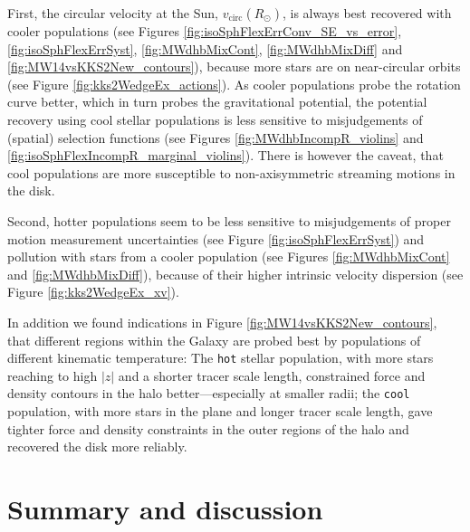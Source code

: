 \documentclass[iop,revtex4,numberedappendix,appendixfloats]{emulateapj}
\begin{document}
First, the circular velocity at the Sun, $v_\text{circ}(R_\odot)$, is always best recovered with cooler populations (see Figures \ref{fig:isoSphFlexErrConv_SE_vs_error}, \ref{fig:isoSphFlexErrSyst}, \ref{fig:MWdhbMixCont}, \ref{fig:MWdhbMixDiff} and \ref{fig:MW14vsKKS2New_contours}), because more stars are on near-circular orbits (see Figure \ref{fig:kks2WedgeEx_actions}). As cooler populations probe the rotation curve better, which in turn probes the gravitational potential, the potential recovery using cool stellar populations is less sensitive to misjudgements of (spatial) selection functions (see Figures \ref{fig:MWdhbIncompR_violins} and \ref{fig:isoSphFlexIncompR_marginal_violins}). There is however the caveat, that cool populations are more susceptible to non-axisymmetric streaming motions in the disk.

Second, hotter populations seem to be less sensitive to misjudgements of proper motion measurement uncertainties (see Figure \ref{fig:isoSphFlexErrSyst}) and pollution with stars from a cooler population (see Figures \ref{fig:MWdhbMixCont} and \ref{fig:MWdhbMixDiff}), because of their higher intrinsic velocity dispersion (see Figure \ref{fig:kks2WedgeEx_xv}).

In addition we found indications in Figure \ref{fig:MW14vsKKS2New_contours}, that different regions within the Galaxy are probed best by populations of different kinematic temperature: The \texttt{hot} stellar population, with more stars reaching to high $|z|$ and a shorter tracer scale length, constrained force and density contours in the halo better---especially at smaller radii; the \texttt{cool} population, with more stars in the plane and longer tracer scale length, gave tighter force and density constraints in the outer regions of the halo and recovered the disk more reliably.

\section{Summary and discussion} \label{sec:discussionsummary}
\end{document}
